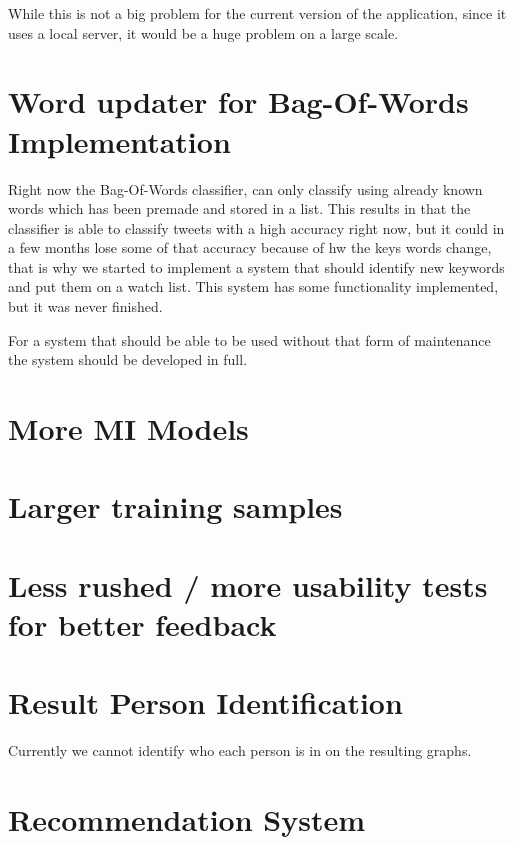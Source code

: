 While this is not a big problem for the current version of the application,
since it uses a local server, it would be a huge problem on a large scale. 

\section{Word updater for Bag-Of-Words Implementation}
Right now the Bag-Of-Words classifier, can only classify using already known
words which has been premade and stored in a list. This results in that the
classifier is able to classify tweets with a high accuracy right now, but it
could in a few months lose some of that accuracy because of hw the keys words 
change, that is why we started to implement a system that should identify new
keywords and put them on  a watch list. This system has some functionality
implemented, but it was never finished.

For a system that should be able to be used without that form of maintenance the
system should be developed in full.

\section{More MI  Models}

\section{Larger training samples}

\section{Less rushed / more usability tests for better feedback}

\section{Result Person Identification}
Currently we cannot identify who each person is in on the resulting graphs.

\section{Recommendation System}
